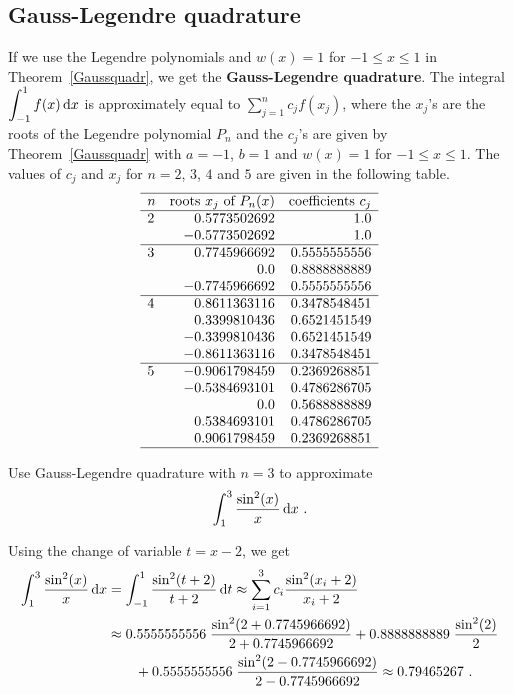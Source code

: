 \subsection{Gauss-Legendre quadrature}

If we use the Legendre polynomials and $w(x) = 1$ for $-1\leq x\leq 1$
in Theorem~\ref{Gaussquadr}, we get the
{\bfseries Gauss-Legendre quadrature}.  The integral 
$\displaystyle \int_{-1}^1 f(x) \,\mathrm{d}x$ is approximately equal to
$\displaystyle \sum_{j=1}^n c_j f(x_j)$, where the $x_j$'s are the
roots of the Legendre polynomial $P_n$ and the $c_j$'s are given by
Theorem~\ref{Gaussquadr} with $a=-1$, $b=1$ and $w(x) = 1$ for
$-1\leq x\leq1$.  The values of $c_j$ and $x_j$ for $n=2$, $3$, $4$
and $5$ are given in the following table.
\[
\begin{array}{lrr}
\hline
n & \text{roots $x_j$ of $P_n(x)$} & \text{coefficients $c_j$} \\
\hline
2 & 0.5773502692 & 1.0 \\
  & -0.5773502692 & 1.0 \\
\hline
3 & 0.7745966692 & 0.5555555556 \\
  & 0.0 & 0.8888888889 \\
  & -0.7745966692 & 0.5555555556 \\
\hline
4 & 0.8611363116 & 0.3478548451 \\
  & 0.3399810436 & 0.6521451549 \\
  & -0.3399810436 & 0.6521451549 \\
  & -0.8611363116 & 0.3478548451 \\
\hline
5 & -0.9061798459 & 0.2369268851 \\
  & -0.5384693101 & 0.4786286705 \\
  & 0.0 & 0.5688888889 \\
  & 0.5384693101 & 0.4786286705 \\
  & 0.9061798459 & 0.2369268851 \\
\hline
\end{array}
\]

\begin{egg}
Use Gauss-Legendre quadrature with $n=3$ to approximate
\[
\int_1^3 \frac{\sin^2(x)}{x}\,\mathrm{d}x\ .
\]

Using the change of variable $t = x - 2$, we get
\begin{align*}
\int_1^3 \frac{\sin^2(x)}{x}\,\mathrm{d}x &=
\int_{-1}^1 \frac{\sin^2(t+2)}{t+2}\,\mathrm{d}t
\approx \sum_{i=1}^3 c_i \frac{\sin^2(x_i+2)}{x_i+2} \\
&\approx 0.5555555556 \;\frac{\sin^2(2+0.7745966692)}{2+0.7745966692} +
0.8888888889\; \frac{\sin^2(2)}{2} \\
& \qquad + 0.5555555556 \;\frac{\sin^2(2-0.7745966692)}{2-0.7745966692}
\approx 0.79465267 \ .
\end{align*}
\end{egg}

